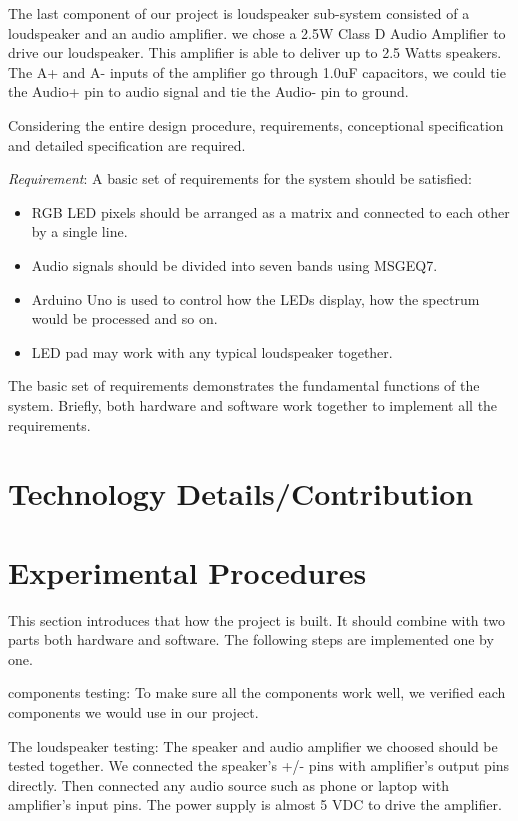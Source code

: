 \documentclass[12pt,a4paper,conference]{IEEEtran}
\begin{document}
The last component of our project is loudspeaker sub-system consisted of a loudspeaker and an audio amplifier. we chose a 2.5W Class D Audio Amplifier to drive our loudspeaker. This amplifier is able to deliver up to 2.5 Watts speakers. The A+ and A- inputs of the amplifier go through 1.0uF capacitors, we could tie the Audio+ pin to audio signal and tie the Audio- pin to ground.

Considering the entire design procedure, requirements, conceptional specification and detailed specification are required.

\emph{Requirement}: A basic set of requirements for the system should be satisfied: 

\begin{itemize}
\item RGB LED pixels should be arranged as a matrix and connected to each other by a single line.
\item Audio signals should be divided into seven bands using MSGEQ7.
\item Arduino Uno is used to control how the LEDs display, how the spectrum would be processed and so on.
\item LED pad may work with any typical loudspeaker together.
\end{itemize}

The basic set of requirements demonstrates the fundamental functions of the system. Briefly, both hardware and software work together to implement all the requirements.

\section{Technology Details/Contribution}

\section{Experimental Procedures}

This section introduces that how the project is built. It should combine with two parts both hardware and software. The following steps are implemented one by one.

components testing: To make sure all the components work well, we  verified each components we would use in our project.

The loudspeaker testing: The speaker and audio amplifier we choosed should be tested together. We connected the speaker's +/- pins with amplifier's output pins directly. Then connected any audio source such as phone or laptop with amplifier's input pins. The power supply is almost 5 VDC to drive the amplifier.
\end{document}
